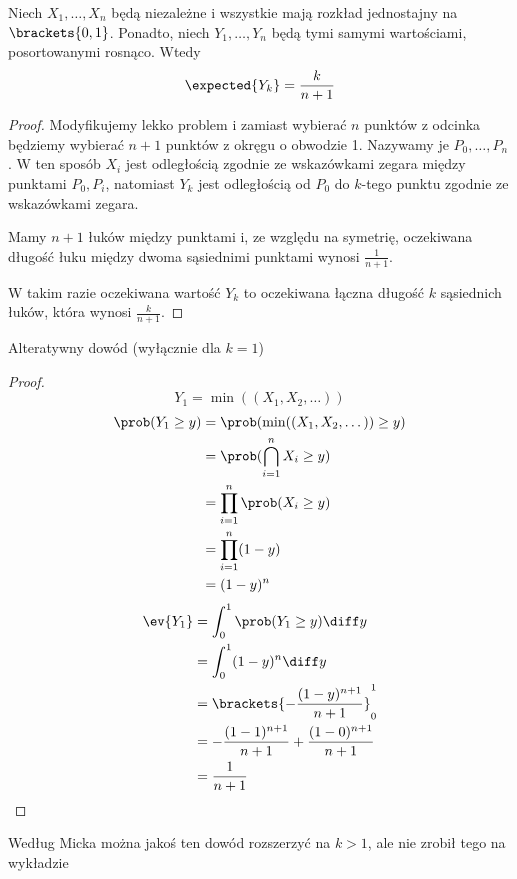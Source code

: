 \begin{theorem}
	Niech \( X_1, \dots, X_n \) będą niezależne i wszystkie mają rozkład jednostajny na \( \brackets{0, 1} \).
	Ponadto, niech \( Y_1, \dots, Y_n \) będą tymi samymi wartościami, posortowanymi rosnąco. Wtedy
	\[
		\expected{Y_k} = \frac{k}{n + 1}
	\]
\end{theorem}
\begin{proof}
	Modyfikujemy lekko problem i zamiast wybierać \( n \) punktów z odcinka będziemy wybierać \( n + 1 \) punktów z okręgu o obwodzie 1. Nazywamy je \(P_0, \dots, P_n\).
	W ten sposób \( X_i \) jest odległością zgodnie ze wskazówkami zegara między punktami \( P_0, P_i \),
	natomiast \( Y_k \) jest odległością od \( P_0 \) do \(k\)-tego punktu zgodnie ze wskazówkami zegara.

	Mamy \( n + 1 \) łuków między punktami i, ze względu na symetrię, oczekiwana długość łuku między dwoma sąsiednimi punktami wynosi \( \frac{1}{n + 1} \).

	W takim razie oczekiwana wartość \( Y_k \) to oczekiwana łączna długość \( k \) sąsiednich łuków, która wynosi \( \frac{k}{n + 1} \).
\end{proof}
Alteratywny dowód (wyłącznie dla \(k = 1\))
\begin{proof}
	\[
		Y_1 = \min((X_1, X_2, \dots))
	\]
	\begin{align*}
		\prob(Y_1 \geq y) & = \prob(\min((X_1, X_2, \dots)) \geq y) \\
		                  & = \prob(\bigcap_{i=1}^n X_i \geq y)     \\
		                  & = \prod_{i=1}^n \prob(X_i \geq y)       \\
		                  & = \prod_{i=1}^n (1-y)                   \\
		                  & = (1-y)^n
	\end{align*}
	\begin{align*}
		\ev{Y_1} & = \int_0^1 \prob(Y_1 \geq y) \diff y                 \\
		         & = \int_0^1 (1-y)^n \diff y                           \\
		         & = \brackets{-\frac{(1-y)^{n+1}}{n+1}}_0^1            \\
		         & = -\frac{(1-1)^{n+1}}{n+1} + \frac{(1-0)^{n+1}}{n+1} \\
		         & = \frac{1}{n+1}
	\end{align*}
\end{proof}
Według Micka można jakoś ten dowód rozszerzyć na \(k > 1\), ale nie zrobił tego na wykładzie

